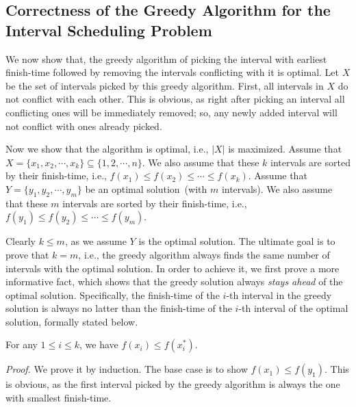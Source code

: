 \subsection*{Correctness of the Greedy Algorithm for the Interval Scheduling Problem}

We now show that, the greedy algorithm of picking the interval with earliest finish-time 
followed by removing the intervals conflicting with it is optimal.
Let $X$ be the set of intervals picked by this greedy algorithm.
First, all intervals in $X$ do not conflict with each other. %
This is obvious, as right after picking an interval all conflicting ones will be immediately removed;
so, any newly added interval will not conflict with ones already picked.

Now we show that the algorithm is optimal, i.e., $|X|$ is maximized.
Assume that $X = \{x_1, x_2, \cdots, x_k\}\subseteq\{1, 2, \cdots, n\}$.
We also assume that these $k$ intervals are sorted by their finish-time, i.e., $f(x_1) \le f(x_2) \le \cdots \le f(x_k)$.
Assume that $Y = \{y_1, y_2, \cdots, y_m\}$ be an optimal solution~(with $m$ intervals).
We also assume that these $m$ intervals are sorted by their finish-time, i.e., $f(y_1) \le f(y_2) \le \cdots \le f(y_m)$.

Clearly $k \le m$, as we assume $Y$ is the optimal solution.
The ultimate goal is to prove that $k = m$, i.e., the greedy algorithm always finds the
same number of intervals with the optimal solution.
In order to achieve it, we first prove a more informative fact,
which shows that the greedy solution always \emph{stays ahead} of the optimal solution. Specifically,
the finish-time of the $i$-th interval in the greedy solution
is always no latter than the finish-time of the $i$-th interval of the optimal solution,
formally stated below.

\begin{fact} \label{int-fact1}
For any $1 \le i \le k$, we have $f(x_i) \le f(x_i^*)$.
\end{fact}

\emph{Proof.} We prove it by induction. The base case
is to show $f(x_1) \le f(y_1)$. This is obvious,
as the first interval picked by the greedy algorithm 
is always the one with smallest finish-time.

